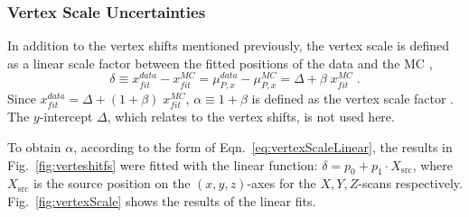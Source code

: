 \subsubsection{Vertex Scale Uncertainties}

In addition to the vertex shifts mentioned previously, the vertex scale is defined as a linear scale factor between the fitted positions of the data and the MC \cite{waterunidoc},
\begin{equation}\label{eq:vertexScaleLinear}
\delta\equiv x^{data}_{fit}-x^{MC}_{fit}=\mu^{data}_{P,x}-\mu^{MC}_{P,x}=\Delta + \beta \; x^{MC}_{fit} \; .
\end{equation}
Since $x^{data}_{fit}=\Delta + (1+\beta) \; x^{MC}_{fit}$, $\alpha\equiv 1+\beta$ is defined as the vertex scale factor \cite{waterunidoc}. The $y$-intercept $\Delta$, which relates to the vertex shifts, is not used here.

To obtain $\alpha$, according to the form of Eqn.~\ref{eq:vertexScaleLinear}, the results in Fig.~\ref{fig:verteshitfs} were fitted with the linear function: $\delta = p_0+p_1 \cdot X_\mathrm{src}$, where $X_\mathrm{src}$ is the source position on the $(x,y,z)$-axes for the $X,Y,Z$-scans respectively. Fig.~\ref{fig:vertexScale} shows the results of the linear fits. %

